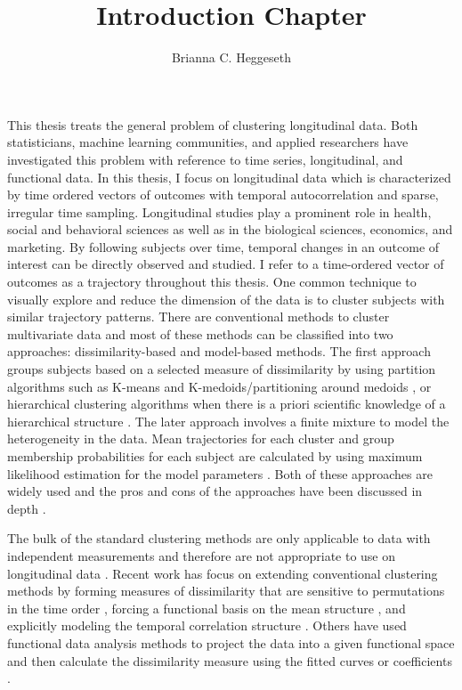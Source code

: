 \documentclass[12pt]{article}
\title{Introduction Chapter}
\author{Brianna C. Heggeseth}
\begin{document}
\doublespace
\maketitle
This thesis treats the general problem of clustering longitudinal data. Both statisticians, machine learning communities, and applied researchers have investigated this problem with reference to time series, longitudinal, and functional data. In this thesis, I focus on longitudinal data which is characterized by time ordered vectors of outcomes with temporal autocorrelation and sparse, irregular time sampling. Longitudinal studies play a prominent role in health, social and behavioral sciences as well as in the biological sciences, economics, and marketing. By following subjects over time, temporal changes in an outcome of interest can be directly observed and studied. I refer to a time-ordered vector of outcomes as a trajectory throughout this thesis. One common technique to visually explore and reduce the dimension of the data is to cluster subjects with similar trajectory patterns. There are conventional methods to cluster multivariate data and most of these methods can be classified into two approaches: dissimilarity-based and model-based methods. The first approach groups subjects based on a selected measure of dissimilarity by using partition algorithms such as K-means \cite{macqueen1967, hartigan1979} and K-medoids/partitioning around medoids \cite{kaufman1990}, or hierarchical clustering algorithms when there is a priori scientific knowledge of a hierarchical structure \cite{murtagh1983}. The later approach involves a finite mixture to model the heterogeneity in the data. Mean trajectories for each cluster and group membership probabilities for each subject are calculated by using maximum likelihood estimation for the model parameters \cite{mclachlan1988,mclachlan2000,everitt1981}. Both of these approaches are widely used and the pros and cons of the approaches have been discussed in depth \cite{magidson2002, everitt1981}.

The bulk of the standard clustering methods are only applicable to data with independent measurements and therefore are not appropriate to use on longitudinal data \cite{everitt2009}. Recent work has focus on extending conventional clustering methods by forming measures of dissimilarity that are sensitive to permutations in the time order \cite{chouakria2007}, forcing a functional basis on the mean structure \cite{nagin1999,gaffney1999}, and explicitly modeling the temporal correlation structure \cite{muthen1999,fraley1999,mcnicholas2010}. Others have used functional data analysis methods \cite{ramsay2002} to project the data into a given functional space and then calculate the dissimilarity measure using the fitted curves or coefficients \cite{serban2005, tarpey2003, abraham2003, tarpey2007,hitchcock2007}.
\end{document}
